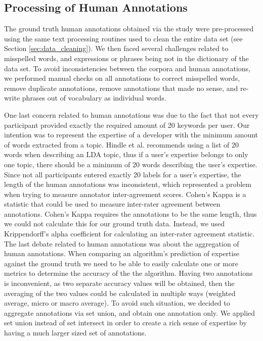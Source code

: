         \subsection{Processing of Human Annotations}
        
            The ground truth human annotations obtained via the study were pre-processed using the same text processing routines used to clean the entire data set (see Section \ref{sec:data_cleaning}). We then faced several challenges related to misspelled words, and expressions or phrases being not in the dictionary of the data set. To avoid inconsistencies between the corpora and human annotations, we performed manual checks on all annotations to correct misspelled words, remove duplicate annotations, remove annotations that made no sense, and re-write phrases out of vocabulary as individual words. 
            
            One last concern related to human annotations was due to the fact that not every participant provided exactly the required amount of 20 keywords per user. Our intention was to represent the expertise of a developer with the minimum amount of words extracted from a topic. Hindle et al. \cite{hindle2012relating} recommends using a list of 20 words when describing an LDA topic, thus if a user's expertise belongs to only one topic, there should be a minimum of 20 words describing the user's expertise. Since not all participants entered exactly 20 labels for a user's expertise, the length of the human annotations was inconsistent, which represented a problem when trying to measure annotator inter-agreement scores. Cohen's Kappa \cite{cohen1960coefficient} is a statistic that could be used to measure inter-rater agreement between annotations. Cohen's Kappa requires the annotations to be the same length, thus we could not calculate this for our ground truth data. Instead, we used Krippendorff's alpha coefficient \cite{krippendorff2013content} for calculating an inter-rater agreement statistic. The last debate related to human annotations was about the aggregation of human annotations. When comparing an algorithm's prediction of expertise against the ground truth we need to be able to easily calculate one or more metrics to determine the accuracy of the the algorithm. Having two annotations is inconvenient, as two separate accuracy values will be obtained, then the averaging of the two values could be calculated in multiple ways (weighted average, micro or macro average). To avoid such situation, we decided to aggregate annotations via set union, and obtain one annotation only. We applied set union instead of set intersect in order to create a rich sense of expertise by having a much larger sized set of annotations.
        
